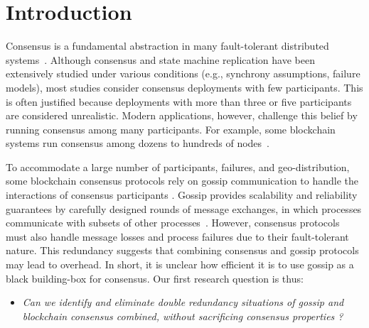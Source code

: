 \section{Introduction}
\label{sec:intro}

Consensus is a fundamental abstraction in many fault-tolerant distributed systems~\cite{Lam78,schneider90}. 
Although consensus and state machine replication have been extensively studied under various conditions (e.g., synchrony assumptions, failure models), most studies consider consensus deployments with few participants. 
This is often justified because deployments with more than three or five participants are considered unrealistic.
Modern applications, however, challenge this belief by running consensus among many participants.
For example, some blockchain systems run consensus among dozens to hundreds of nodes~\cite{bucham18,buterin17,libra18}.

To accommodate a large number of participants, failures, and geo-distribution, some blockchain consensus protocols rely on gossip communication to handle the interactions of consensus participants \cite{Hyperledger,bucham18,buterin17,libra18}.
Gossip provides scalability and reliability guarantees by carefully designed rounds of message exchanges, in which processes communicate with subsets of other processes~\cite{demers87, Birman99}.
However, consensus protocols must also handle message losses and process failures due to their fault-tolerant nature.
This redundancy suggests that combining consensus and gossip protocols may lead to overhead.
In short, it is unclear how efficient it is to use gossip as a black building-box for consensus.  Our first research question is thus:

\vspace{-2mm}
\begin{itemize}
\item[] \emph{Can we identify and eliminate double redundancy situations of gossip and blockchain consensus combined, 
            without sacrificing consensus properties ?}
\end{itemize}
\vspace{-2mm}

